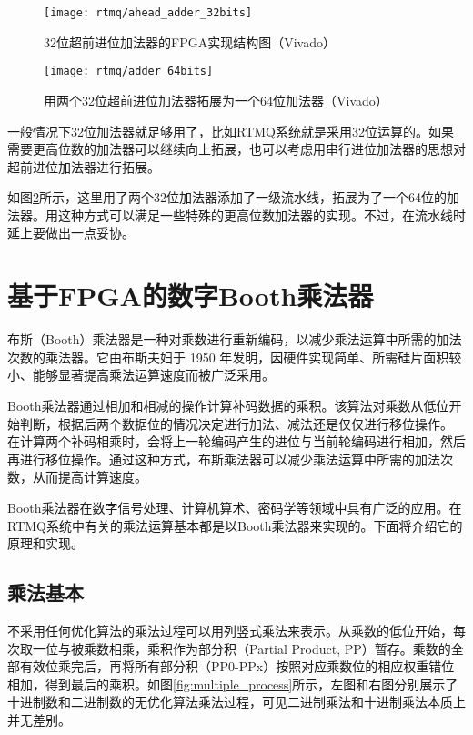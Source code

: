 \begin{figure}
    \centering
    \caption[32位超前进位加法器的FPGA实现结构图]{32位超前进位加法器的FPGA实现结构图（Vivado）\label{fig:ahead_adder_32bits}}
    \texttt{[image: rtmq/ahead\_adder\_32bits]}
\end{figure}
\begin{figure}
    \centering
    \caption[用两个32位超前进位加法器拓展为一个64位加法器]{用两个32位超前进位加法器拓展为一个64位加法器（Vivado）\label{fig:adder_64bits}}
    \texttt{[image: rtmq/adder\_64bits]}
\end{figure}

一般情况下32位加法器就足够用了，比如RTMQ系统就是采用32位运算的。如果需要更高位数的加法器可以继续向上拓展，也可以考虑用串行进位加法器的思想对超前进位加法器进行拓展。

如图\ref{fig:adder_64bits}所示，这里用了两个32位加法器添加了一级流水线，拓展为了一个64位的加法器。用这种方式可以满足一些特殊的更高位数加法器的实现。不过，在流水线时延上要做出一点妥协。







\newpage
\section[基于FPGA的数字Booth乘法器]{基于FPGA的数字Booth乘法器\label{section:booth_multiplier}}
布斯（Booth）乘法器是一种对乘数进行重新编码，以减少乘法运算中所需的加法次数的乘法器。它由布斯夫妇于 1950 年发明，因硬件实现简单、所需硅片面积较小、能够显著提高乘法运算速度而被广泛采用。

Booth乘法器通过相加和相减的操作计算补码数据的乘积。该算法对乘数从低位开始判断，根据后两个数据位的情况决定进行加法、减法还是仅仅进行移位操作。
在计算两个补码相乘时，会将上一轮编码产生的进位与当前轮编码进行相加，然后再进行移位操作。通过这种方式，布斯乘法器可以减少乘法运算中所需的加法次数，从而提高计算速度。

Booth乘法器在数字信号处理、计算机算术、密码学等领域中具有广泛的应用\cite[]{Jigjidsuren_Badarch_Sukhbaatar_Namsrai_2021}。在RTMQ系统中有关的乘法运算基本都是以Booth乘法器来实现的。下面将介绍它的原理和实现。

\subsection[乘法基本]{乘法基本}
不采用任何优化算法的乘法过程可以用列竖式乘法来表示。从乘数的低位开始，每次取一位与被乘数相乘，乘积作为部分积（Partial Product, PP）暂存。乘数的全部有效位乘完后，再将所有部分积（PP0-PPx）按照对应乘数位的相应权重错位相加，得到最后的乘积。如图\ref{fig:multiple_process}所示，左图和右图分别展示了十进制数和二进制数的无优化算法乘法过程，可见二进制乘法和十进制乘法本质上并无差别。

